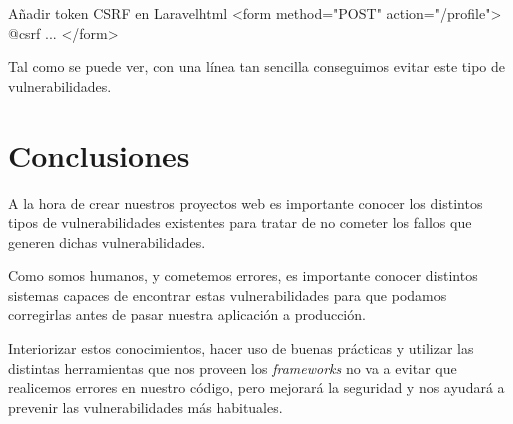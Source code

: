 \documentclass{\ClassPath/viu-tfm-template}
\begin{document}
\begin{mycode}{Añadir token CSRF en Laravel}{html}{}
<form method="POST" action="/profile">
    @csrf
    ...
</form>
\end{mycode}

Tal como se puede ver, con una línea tan sencilla conseguimos evitar este tipo de vulnerabilidades.



\chapter{Conclusiones}

A la hora de crear nuestros proyectos web es importante conocer los distintos tipos de vulnerabilidades existentes para tratar de no cometer los fallos que generen dichas vulnerabilidades.

Como somos humanos, y cometemos errores, es importante conocer distintos sistemas capaces de encontrar  estas vulnerabilidades para que podamos corregirlas antes de pasar nuestra aplicación a producción.

Interiorizar estos conocimientos, hacer uso de buenas prácticas y utilizar las distintas herramientas que nos proveen los \textit{frameworks} no va a evitar que realicemos errores en nuestro código, pero mejorará la seguridad y nos ayudará a prevenir las vulnerabilidades más habituales.
\end{document}
